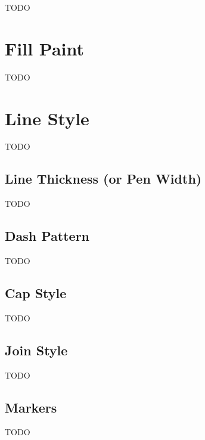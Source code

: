 
TODO


\section{Fill Paint}\label{sec:fillpaint}


TODO


\section{Line Style}\label{sec:pathstyle}

TODO


\subsection{Line Thickness (or Pen Width)}\label{sec:penwidth}


TODO


\subsection{Dash Pattern}\label{sec:dashpattern}


TODO


\subsection{Cap Style}\label{sec:capstyle}


TODO


\subsection{Join Style}\label{sec:joinstyle}


TODO


\subsection{Markers}\label{sec:markers}

TODO


